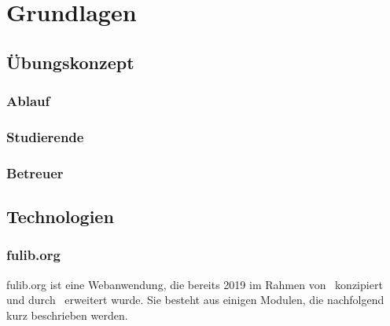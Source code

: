 \chapter{Grundlagen}\label{ch:basics}

\section{Übungskonzept}\label{sec:programming-assignments}


\subsection{Ablauf}\label{subsec:workflow}


\subsection{Studierende}\label{subsec:students}


\subsection{Betreuer}\label{subsec:teaching-assistants}


\section{Technologien}\label{sec:tech}

\subsection{fulib.org}\label{subsec:fulib.org}


fulib.org ist eine Webanwendung, die bereits 2019 im Rahmen von~\cite{explain} konzipiert und durch~\cite{bachelor-thesis} erweitert wurde.
Sie besteht aus einigen Modulen, die nachfolgend kurz beschrieben werden.

